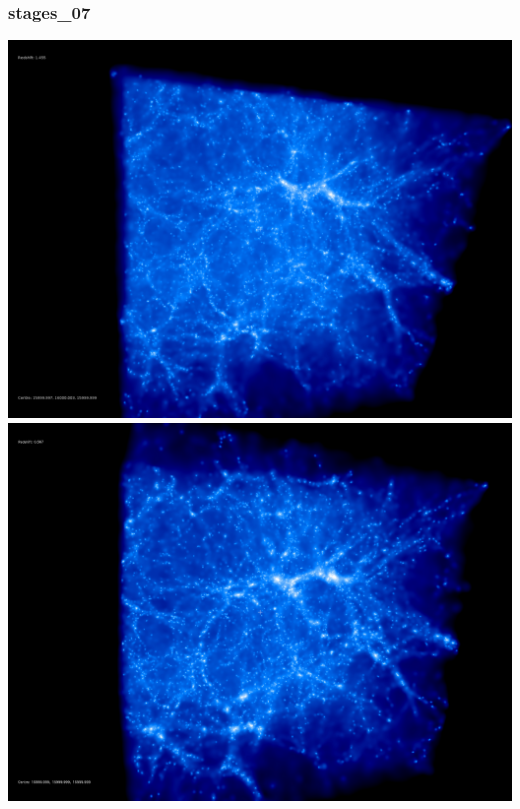 % 
%
%
%
%
%
%
%

\newpage
\subsubsection{stages\_07}

\includegraphics[scale=0.1]{r256/h100/stages_07/50.jpg} 
\includegraphics[scale=0.1]{r256/h100/stages_07/100.jpg}  \\


